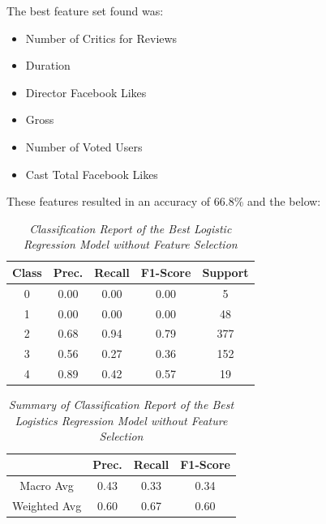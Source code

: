 \documentclass[11pt]{article}
\begin{document}
\noindent
The best feature set found was:
\begin{itemize}
    \item Number of Critics for Reviews
    \item Duration
    \item Director Facebook Likes
    \item Gross
    \item Number of Voted Users
    \item Cast Total Facebook Likes
\end{itemize}
\noindent
These features resulted in an accuracy of 66.8\% and the below:

\begin{table}[!ht]
    \begin{center}
        \begin{tabular}{c|c|c|c|c}			
            \hline
            Class & Prec. & Recall & F1-Score & Support \\
            \hline\hline
            0 & 0.00 & 0.00 & 0.00 & 5 \\
            1 & 0.00 & 0.00 & 0.00 & 48 \\
            2 & 0.68 & 0.94 & 0.79 & 377 \\
            3 & 0.56 & 0.27 & 0.36 & 152 \\
            4 & 0.89 & 0.42 & 0.57 & 19\\
                \hline
        \end{tabular}

        \caption{\textit{Classification Report of the Best Logistic Regression Model without Feature Selection}}
        \label{logr-ft-report}

    \end{center}
\end{table}
\begin{table}[!ht]
    \begin{center}
        \begin{tabular}{c||c|c|c}			
            \hline
             & Prec. & Recall & F1-Score \\
            \hline\hline
            Macro Avg & 0.43 & 0.33 & 0.34 \\
            Weighted Avg & 0.60 & 0.67 & 0.60 \\
                \hline
        \end{tabular}

        \caption{\textit{Summary of Classification Report of the Best Logistics Regression Model without Feature Selection}}
        \label{logr-ft-report-sum}

    \end{center}
\end{table}
\end{document}
